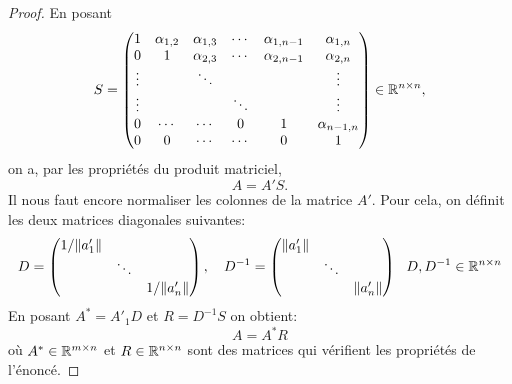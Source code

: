 \begin{proof}
En posant 
\begin{displaymath}
S = %
\begin{pmatrix}
1 & \alpha_{1,2} & \alpha_{1,3} & \cdots & \alpha_{1,n-1} & \alpha_{1,n}\\
0 & 1 & \alpha_{2,3} & \cdots & \alpha_{2,n-1} & \alpha_{2,n} \\
\vdots && \ddots &&& \vdots \\
\vdots &&& \ddots &&\vdots\\
0 & \cdots & \cdots&0& 1 & \alpha_{n-1,n}\\
0 & 0 & \cdots &\cdots & 0 & 1
\end{pmatrix} \in \R^{n \times n}, 
\end{displaymath}
on a, par les propriétés du produit matriciel,
\begin{displaymath}
A = A'S.  %
\end{displaymath}
Il nous faut encore normaliser les colonnes de la matrice $A'$. Pour cela, on définit les deux matrices diagonales suivantes:
\begin{displaymath}
D=\begin{pmatrix}
1/\|a'_1\| & & \\
& \ddots & \\
& & 1/\|a'_n\|
\end{pmatrix} , \quad 
D^{-1}=\begin{pmatrix}
\|a'_1\| & & \\
& \ddots & \\
& & \|a'_n\|
\end{pmatrix} 
~~ D,D^{-1} \in \mathbb{R}^{n \times n}
\end{displaymath}
En posant $A^*=A'_1D$ et $R=D^{-1}S$ on obtient:
\begin{displaymath}
A=A^* R
\end{displaymath}
où $A^* \in \mathbb{R}^{m\times n}$ et $R \in \mathbb{R}^{n \times n}$ sont des matrices qui vérifient les propriétés de l'énoncé. 
\end{proof}


